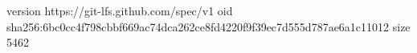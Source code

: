 version https://git-lfs.github.com/spec/v1
oid sha256:6bc0cc4f798cbbf669ac74dca262ce8fd4220f9f39ec7d555d787ae6a1c11012
size 5462
